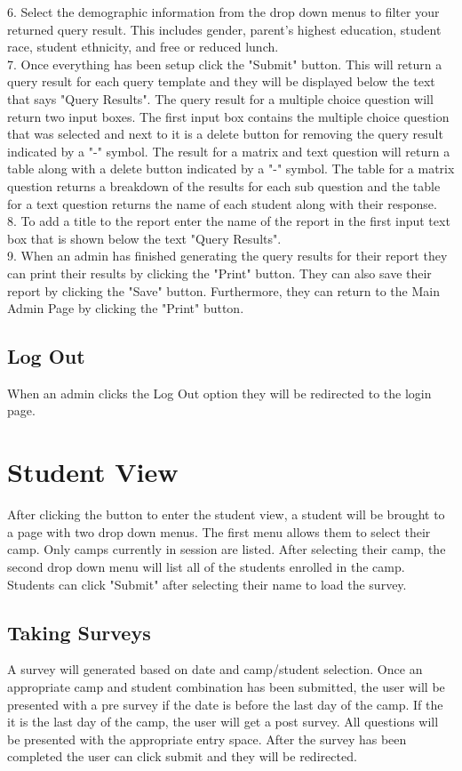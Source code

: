 \documentclass[letterpaper,10pt,serif, draftclsnofoot,onecolumn, compsoc, titlepage]{IEEEtran}
\begin{document}
6. Select the demographic information from the drop down menus to filter your returned query result. This includes gender, parent's highest education, student race, student ethnicity, and free or reduced lunch.\\ 
7. Once everything has been setup click the "Submit" button. This will return a query result for each query template and they will be displayed below the text that says "Query Results". The query result for a multiple choice question will return two input boxes. The first input box contains the multiple choice question that was selected and next to it is a delete button for removing the query result indicated by a "-" symbol. The result for a matrix and text question will return a table along with a delete button indicated by a "-" symbol. The table for a matrix question returns a breakdown of the results for each sub question and the table for a text question returns the name of each student along with their response.\\
8. To add a title to the report enter the name of the report in the first input text box that is shown below the text "Query Results".\\ 
9. When an admin has finished generating the query results for their report they can print their results by clicking the "Print" button. They can also save their report by clicking the "Save" button. Furthermore, they can return to the Main Admin Page by clicking the "Print" button.\\ 
\subsection{Log Out}
When an admin clicks the Log Out option they will be redirected to the login page. 
\section{Student View}
After clicking the button to enter the student view, a student will be brought to a page with two drop down menus.
The first menu allows them to select their camp.
Only camps currently in session are listed.
After selecting their camp, the second drop down menu will list all of the students enrolled in the camp.
Students can click "Submit" after selecting their name to load the survey.
\subsection{Taking Surveys}
A survey will generated based on date and camp/student selection. Once an appropriate camp and student combination 
has been submitted, the user will be presented with a pre survey if the date is before the last day of the camp. If 
the it is the last day of the camp, the user will get a post survey. All questions will be presented with the 
appropriate entry space. After the survey has been completed the user can click submit and they will be redirected.
\end{document}
